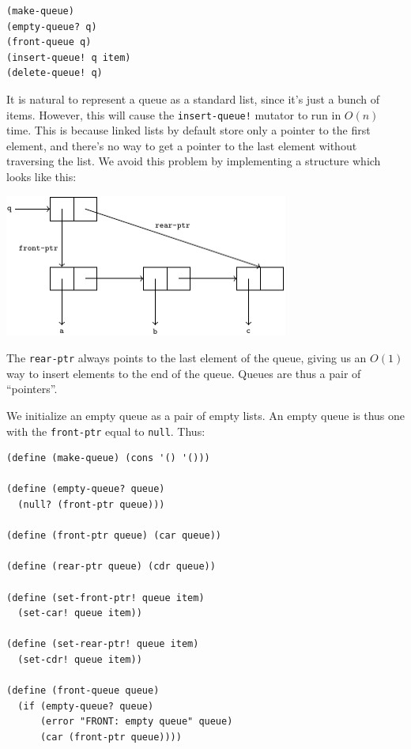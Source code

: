 \documentclass[9pt]{report}
\begin{document}
\begin{verbatim}
(make-queue)
(empty-queue? q)
(front-queue q)
(insert-queue! q item)
(delete-queue! q)
\end{verbatim}

It is natural to represent a queue as a standard list, since it's
just a bunch of items. However, this will cause the
\texttt{insert-queue!} mutator to run in \(O(n)\) time. This is because
linked lists by default store only a pointer to the first element,
and there's no way to get a pointer to the last element without
traversing the list. We avoid this problem by implementing a
structure which looks like this:

\begin{center}
\includegraphics[width=0.7\textwidth]{./images/q.pdf}
\end{center}

The \texttt{rear-ptr} always points to the last element of the queue,
giving us an \(O(1)\) way to insert elements to the end of the
queue. Queues are thus a pair of ``pointers''.

We initialize an empty queue as a pair of empty lists. An empty
queue is thus one with the \texttt{front-ptr} equal to \texttt{null}. Thus:

\begin{verbatim}
(define (make-queue) (cons '() '()))

(define (empty-queue? queue)
  (null? (front-ptr queue)))

(define (front-ptr queue) (car queue))

(define (rear-ptr queue) (cdr queue))

(define (set-front-ptr! queue item)
  (set-car! queue item))

(define (set-rear-ptr! queue item)
  (set-cdr! queue item))

(define (front-queue queue)
  (if (empty-queue? queue)
      (error "FRONT: empty queue" queue)
      (car (front-ptr queue))))
\end{verbatim}
\end{document}
